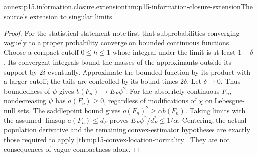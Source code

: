 \begin{annexitem}{annex:p15.information.closure.extension}{thm:p15-information-closure-extension}{The source's extension to singular limits}
\begin{proof}
For the statistical statement note first that subprobabilities
converging vaguely to a proper probability converge on bounded
continuous functions. Choose a compact cutoff \(0\leq h\leq1\)
whose integral under the limit is at least \(1-\delta\).
Its convergent integrals bound the masses of the approximants
outside its support by \(2\delta\) eventually. Approximate the
bounded function by its product with a larger cutoff; the tails
are controlled by its bound times \(2\delta\). Let \(\delta\to0\).
Thus boundedness of \(\psi\) gives \(b(F_n)\to E_F\psi^2\).
For the absolutely continuous \(F_n\), nondecreasing \(\psi\)
has \(a(F_n)\geq0\), regardless of modifications of \(\chi\)
on Lebesgue-null sets. The saddlepoint bound gives
\(a(F_n)^2\geq\alpha b(F_n)\).
Taking limits with the assumed \(\limsup a(F_n)\leq d_F\) proves
\(E_F\psi^2/d_F^2\leq1/\alpha\).
Centering, the actual population derivative and the remaining
convex-estimator hypotheses are exactly those required to apply
\cref{thm:p15-convex-location-normality}. They are not consequences
of vague compactness alone.
\end{proof}
\end{annexitem}

